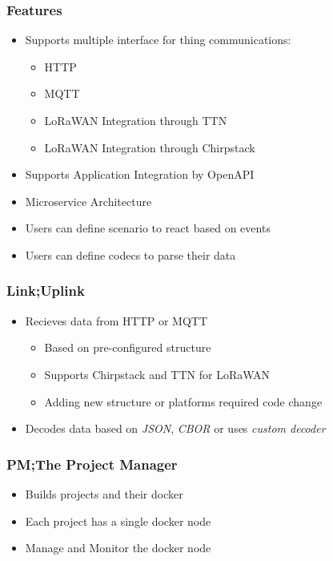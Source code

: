 \documentclass{../iot-lecture}
\begin{document}
\begin{frame}
  \frametitle{Features}
  \begin{itemize}
    \item Supports multiple interface for thing communications:
    \begin{itemize}
      \item HTTP
      \item MQTT
      \item LoRaWAN Integration through TTN
      \item LoRaWAN Integration through Chirpstack
    \end{itemize}
    \item Supports Application Integration by OpenAPI
    \item Microservice Architecture
    \item Users can define scenario to react based on events
    \item Users can define codecs to parse their data
  \end{itemize}
\end{frame}

\begin{frame}
  \frametitle{Link;\@ Uplink}
  \begin{itemize}
    \item Recieves data from HTTP or MQTT
    \begin{itemize}
      \item Based on pre-configured structure
      \item Supports Chirpstack and TTN for LoRaWAN
      \item Adding new structure or platforms required code change
    \end{itemize}
    \item Decodes data based on \textit{\color{LimeGreen} JSON}, \textit{\color{Orange} CBOR} or uses \textit{\color{RubineRed} custom decoder}
  \end{itemize}
\end{frame}

\begin{frame}
  \frametitle{PM;\@ The Project Manager}
  \begin{itemize}
    \item Builds projects and their {\color{Cyan} docker}
    \item Each project has a single docker node
    \item Manage and Monitor the docker node
  \end{itemize}
\end{frame}
\end{document}
